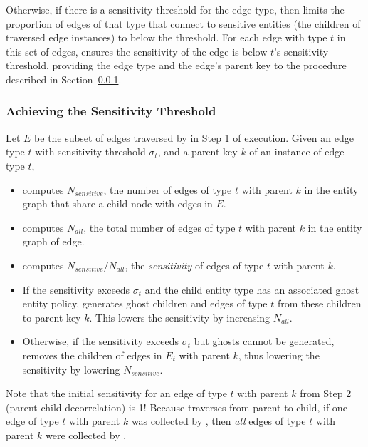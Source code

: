 \begin{enumerate}
        Otherwise, if there is a sensitivity threshold for the edge type, then \sys{} limits the
        proportion of edges of that type that connect to sensitive entities (the children of
        traversed edge instances) to below the threshold. 
        For each edge with type $t$ in this set of edges, \sys{} ensures the
        sensitivity of the edge is below $t$'s sensitivity threshold, providing the edge type and the edge's
        parent key to the procedure described in Section~\ref{sensitivity_algo}. 
\end{enumerate}

\subsubsection{Achieving the Sensitivity Threshold}
\label{sensitivity_algo}
Let $E$ be the subset of edges traversed by \sys{} in Step 1 of execution. 
Given an edge type $t$ with sensitivity threshold $\sigma_t$, and a parent key $k$ of an instance of
edge type $t$, 
    \begin{itemize}
        \item \sys{} computes $N_{sensitive}$, the number of edges of type $t$ with parent $k$ in the entity graph that share 
            a child node with edges in $E$.
        \item \sys{} computes $N_{all}$, the total number of edges of type $t$ with parent $k$
            in the entity graph of edge.
        \item \sys{} computes $N_{sensitive}/N_{all}$, the \emph{sensitivity} of edges of type $t$
            with parent $k$.
        \item If the sensitivity exceeds $\sigma_t$ and the child entity type has an associated ghost entity policy, \sys{}
            generates ghost children and edges of type $t$ from these children to parent
            key $k$. This lowers the sensitivity by increasing $N_{all}$.
        \item Otherwise, if the sensitivity exceeds $\sigma_t$ but ghosts cannot be generated,
            \sys{} removes the children of edges in $E_t$ with parent $k$, thus lowering the
            sensitivity by lowering $N_{sensitive}$.
    \end{itemize}

Note that the initial sensitivity for an edge of type $t$ with parent $k$ from Step 2 (parent-child
decorrelation) is 1! Because \sys{} traverses from parent to child, if one edge of type $t$ with
parent $k$ was collected by \sys{}, then \emph{all} edges of type $t$ with parent $k$ were collected
by \sys{}. 

